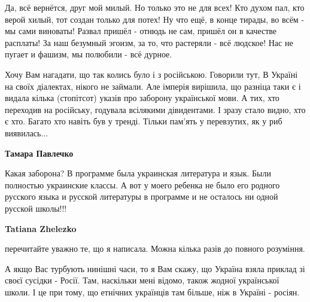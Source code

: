 \begin{itemize}
Да, всё вернётся, друг мой милый. Но только это не для всех! Кто духом пал, кто
верой хилый, тот создан только для потех! Ну что ещё, в конце тирады, во всём -
мы сами виноваты! Развал пришёл - отнюдь не сам, пришёл он в качестве расплаты!
За наш безумный эгоизм, за то, что растеряли - всё людское! Нас не пугает и
фашизм, мы полюбили - всё дурное.

 

Хочу Вам нагадати, що так колись було і з російською. Говорили тут, В Україні
на своїх діалектах, нікого не займали. Але імперія вирішила, що разніца таки є
і видала кілька (стопітсот) указів про заборону української мови. А тих, хто
переходив на російську, годувала всілякими дівидентами. І зразу стало видно,
хто є хто. Багато хто навіть був у тренді. Тільки пам'ять у перевзутих, як у
риб виявилась...

\begin{itemize}
 
\textbf{Тамара Павлечко} 

Какая заборона? В программе была украинская литература и язык. Были полностью
украинские классы. А вот у моего ребенка не было его родного русского языка и
русской литературы в программе и не осталось ни одной русской школы!!!


 
\textbf{Tatiana Zhelezko} 

перечитайте уважно те, що я написала. Можна кілька разів до повного розуміння.

А якщо Вас турбують нинішні часи, то я Вам скажу, що Україна взяла приклад зі
своєї сусідки - Росії. Там, наскільки мені відомо, також жодної української
школи. І це при тому, що етнічних українців там більше, ніж в Україні - росіян.



\end{itemize}
\end{itemize}
